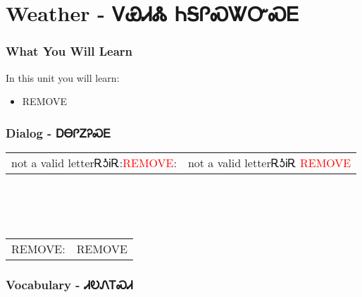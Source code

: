 \chapter{Weather - ᏙᏯᏗᏜ ᏂᎦᎵᏍᏔᏅᏍᎬ}
\subsection{What You Will Learn}
In this unit you will learn:
\begin{itemize}
\item REMOVE
\end{itemize}\newpage

\newpage\subsection{Dialog - ᎠᎾᎵᏃᎮᏍᎬ}
\begin{tabular}{p{2cm} p{11cm}}
not a valid letterᎡᎼᎥᎡ:\newline \textcolor{red}{REMOVE}: & not a valid letterᎡᎼᎥᎡ 
\newline\textcolor{red}{REMOVE}\\
\end{tabular}
\\
\\
\\
\noindent\begin{tabular}{p{2cm} p{11cm}}REMOVE: & REMOVE\\
\end{tabular}
\vfill\newpage\subsection{Vocabulary - ᏗᎧᏁᎢᏍᏗ 
}
